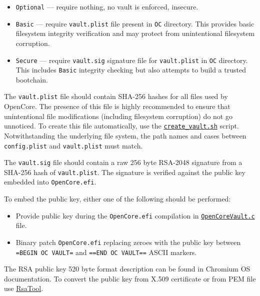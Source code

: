 \documentclass[]{article}
\providecommand{\tightlist}{%
  \setlength{\itemsep}{0pt}\setlength{\parskip}{0pt}}
\begin{document}
\begin{enumerate}
  \begin{itemize}
  \tightlist
  \item \texttt{Optional} --- require nothing, no vault is enforced, insecure.
  \item \texttt{Basic} --- require \texttt{vault.plist} file present
  in \texttt{OC} directory. This provides basic filesystem integrity
  verification and may protect from unintentional filesystem corruption.
  \item \texttt{Secure} --- require \texttt{vault.sig} signature file for
  \texttt{vault.plist} in \texttt{OC} directory. This includes \texttt{Basic}
  integrity checking but also attempts to build a trusted bootchain.
  \end{itemize}

  The \texttt{vault.plist} file should contain SHA-256 hashes for all files used by OpenCore.
  The presence of this file is highly recommended to ensure that unintentional file modifications
  (including filesystem corruption) do not go unnoticed. To create this file automatically, use the
  \href{https://github.com/acidanthera/OpenCorePkg/tree/master/Utilities/CreateVault}{\texttt{create\_vault.sh}}
  script. Notwithstanding the underlying file system, the path names and cases between \texttt{config.plist}
  and \texttt{vault.plist} must match.

  The \texttt{vault.sig} file should contain a raw 256 byte RSA-2048 signature from a SHA-256
  hash of \texttt{vault.plist}. The signature is verified against the public key embedded
  into \texttt{OpenCore.efi}.

  To embed the public key, either one of the following should be performed:

  \begin{itemize}
  \tightlist
  \item Provide public key during the \texttt{OpenCore.efi} compilation in
  \href{https://github.com/acidanthera/OpenCorePkg/blob/master/Platform/OpenCore/OpenCoreVault.c}{\texttt{OpenCoreVault.c}} file.
  \item Binary patch \texttt{OpenCore.efi} replacing zeroes with the public key
  between \texttt{=BEGIN OC VAULT=} and \texttt{==END OC VAULT==} ASCII markers.
  \end{itemize}

  The RSA public key 520 byte format description can be found in Chromium OS documentation.
  To convert the public key from X.509 certificate or from PEM file use
  \href{https://github.com/acidanthera/OpenCorePkg/tree/master/Utilities/CreateVault}{RsaTool}.



\end{enumerate}
\end{document}
